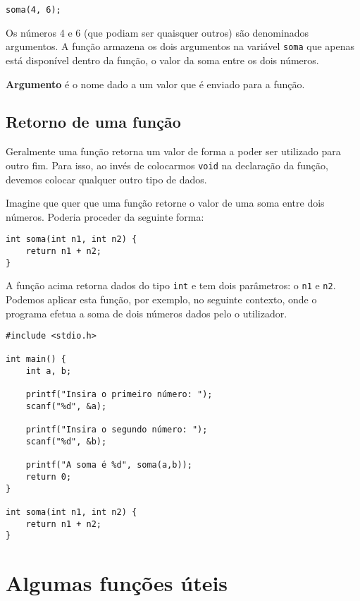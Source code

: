 \begin{lstlisting}
soma(4, 6);
\end{lstlisting}

Os números 4 e 6 (que podiam ser quaisquer outros) são denominados argumentos. A função armazena os dois argumentos na variável \texttt{soma} que apenas está disponível dentro da função, o valor da soma entre os dois números.
 
\begin{defi}
\textbf{Argumento} é o nome dado a um valor que é enviado para a função.
\end{defi}

\subsection{Retorno de uma função}

Geralmente uma função retorna um valor de forma a poder ser utilizado para outro fim. Para isso, ao invés de colocarmos \texttt{void} na declaração da função, devemos colocar qualquer outro tipo de dados.

Imagine que quer que uma função retorne o valor de uma soma entre dois números. Poderia proceder da seguinte forma:

\begin{lstlisting}
int soma(int n1, int n2) {
    return n1 + n2;
}
\end{lstlisting}

A função acima retorna dados do tipo \texttt{int} e tem dois parâmetros: o \texttt{n1} e \texttt{n2}. Podemos aplicar esta função, por exemplo, no seguinte contexto, onde o programa efetua a soma de dois números dados pelo o utilizador.

\begin{lstlisting}
#include <stdio.h>
 
int main() {
    int a, b;
 
    printf("Insira o primeiro número: ");
    scanf("%d", &a);
 
    printf("Insira o segundo número: ");
    scanf("%d", &b);
 
    printf("A soma é %d", soma(a,b));
    return 0;
}
 
int soma(int n1, int n2) {
    return n1 + n2;
}
\end{lstlisting}

\section{Algumas funções úteis}

